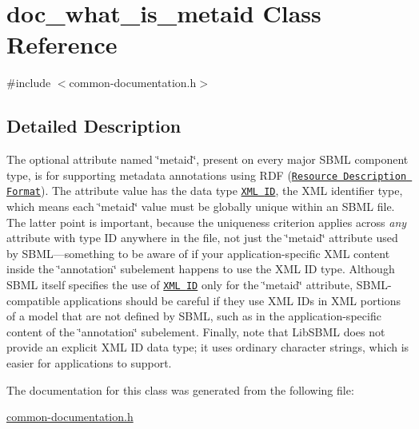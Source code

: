 \hypertarget{classdoc__what__is__metaid}{}\section{doc\+\_\+what\+\_\+is\+\_\+metaid Class Reference}
\label{classdoc__what__is__metaid}


{\ttfamily \#include $<$common-\/documentation.\+h$>$}



\subsection{Detailed Description}
\begin{DoxyParagraph}{}
The optional attribute named \char`\"{}metaid\char`\"{}, present on every major S\+B\+ML component type, is for supporting metadata annotations using R\+DF (\href{http://www.w3.org/RDF/}{\tt Resource Description Format}). The attribute value has the data type \href{http://www.w3.org/TR/REC-xml/#id}{\tt X\+ML {\ttfamily ID}}, the X\+ML identifier type, which means each \char`\"{}metaid\char`\"{} value must be globally unique within an S\+B\+ML file. The latter point is important, because the uniqueness criterion applies across {\itshape any} attribute with type {\ttfamily ID} anywhere in the file, not just the \char`\"{}metaid\char`\"{} attribute used by S\+B\+ML---something to be aware of if your application-\/specific X\+ML content inside the \char`\"{}annotation\char`\"{} subelement happens to use the X\+ML {\ttfamily ID} type. Although S\+B\+ML itself specifies the use of \href{http://www.w3.org/TR/REC-xml/#id}{\tt X\+ML {\ttfamily ID}} only for the \char`\"{}metaid\char`\"{} attribute, S\+B\+M\+L-\/compatible applications should be careful if they use X\+ML {\ttfamily ID}\textquotesingle{}s in X\+ML portions of a model that are not defined by S\+B\+ML, such as in the application-\/specific content of the \char`\"{}annotation\char`\"{} subelement. Finally, note that Lib\+S\+B\+ML does not provide an explicit X\+ML {\ttfamily ID} data type; it uses ordinary character strings, which is easier for applications to support. 
\end{DoxyParagraph}


The documentation for this class was generated from the following file\+:\begin{DoxyCompactItemize}
\item 
\hyperlink{common-documentation_8h}{common-\/documentation.\+h}\end{DoxyCompactItemize}
